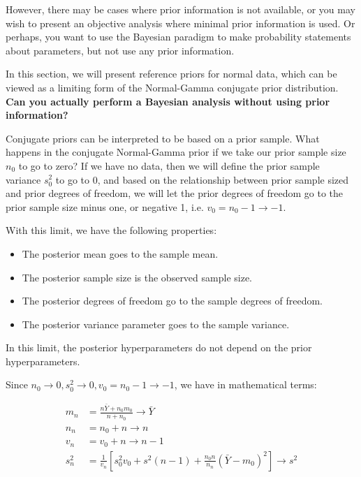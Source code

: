 \documentclass[]{book}
\theoremstyle{definition}
\theoremstyle{definition}
\theoremstyle{definition}
\theoremstyle{remark}
\begin{document}
However, there may be cases where prior information is not available, or
you may wish to present an objective analysis where minimal prior
information is used. Or perhaps, you want to use the Bayesian paradigm
to make probability statements about parameters, but not use any prior
information.

In this section, we will present reference priors for normal data, which
can be viewed as a limiting form of the Normal-Gamma conjugate prior
distribution. \textbf{Can you actually perform a Bayesian analysis
without using prior information?}

Conjugate priors can be interpreted to be based on a prior sample. What
happens in the conjugate Normal-Gamma prior if we take our prior sample
size \(n_0\) to go to zero? If we have no data, then we will define the
prior sample variance \(s_0^2\) to go to 0, and based on the
relationship between prior sample sized and prior degrees of freedom, we
will let the prior degrees of freedom go to the prior sample size minus
one, or negative 1, i.e. \(v_0 = n_0 - 1 \rightarrow -1\).

With this limit, we have the following properties:

\begin{itemize}
\item
  The posterior mean goes to the sample mean.
\item
  The posterior sample size is the observed sample size.
\item
  The posterior degrees of freedom go to the sample degrees of freedom.
\item
  The posterior variance parameter goes to the sample variance.
\end{itemize}

In this limit, the posterior hyperparameters do not depend on the prior
hyperparameters.

Since
\(n_0 \rightarrow 0, s^2_0 \rightarrow 0, v_0 = n_0 - 1 \rightarrow -1\),
we have in mathematical terms:

\[\begin{aligned}
m_n &= \frac{n \bar{Y} + n_0 m_0} {n + n_0}  \rightarrow \bar{Y} \\
n_n &= n_0 + n  \rightarrow n \\
v_n &= v_0 + n  \rightarrow n-1 \\
s^2_n &= \frac{1}{v_n}\left[s^2_0 v_0 + s^2 (n-1) + \frac{n_0 n}{n_n} (\bar{Y} - m_0)^2 \right] \rightarrow s^2
\end{aligned}\]
\end{document}
